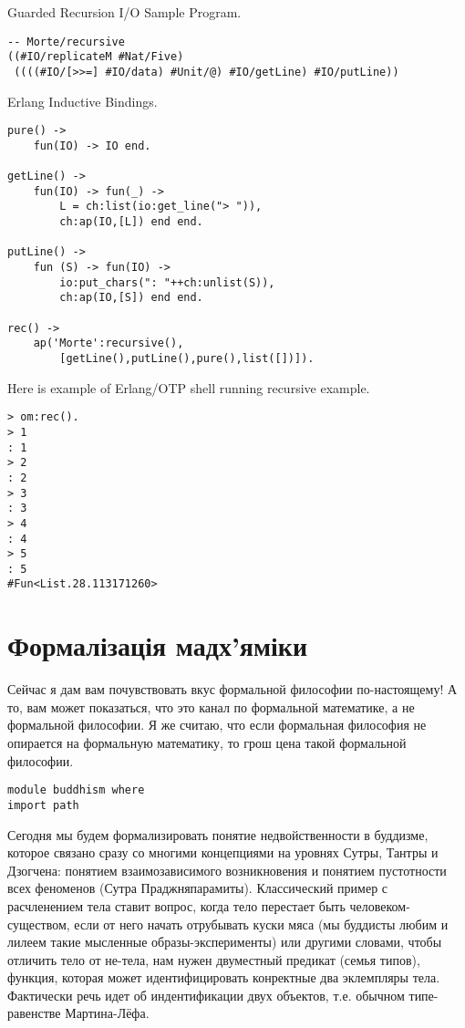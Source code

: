 Guarded Recursion I/O Sample Program.

\begin{lstlisting}[mathescape=true]
-- Morte/recursive
((#IO/replicateM #Nat/Five)
 ((((#IO/[>>=] #IO/data) #Unit/@) #IO/getLine) #IO/putLine))
\end{lstlisting}

\newpage
Erlang Inductive Bindings.

\begin{lstlisting}[mathescape=true]
pure() ->
    fun(IO) -> IO end.

getLine() ->
    fun(IO) -> fun(_) ->
        L = ch:list(io:get_line("> ")),
        ch:ap(IO,[L]) end end.

putLine() ->
    fun (S) -> fun(IO) ->
        io:put_chars(": "++ch:unlist(S)),
        ch:ap(IO,[S]) end end.

rec() ->
    ap('Morte':recursive(),
        [getLine(),putLine(),pure(),list([])]).
\end{lstlisting}


Here is example of Erlang/OTP shell running recursive example.

\begin{lstlisting}[mathescape=true]
> om:rec().
> 1
: 1
> 2
: 2
> 3
: 3
> 4
: 4
> 5
: 5
#Fun<List.28.113171260>
\end{lstlisting}

\newpage
\section{Формалізація мадх'яміки}

Сейчас я дам вам почувствовать вкус формальной философии по-настоящему!
А то, вам может показаться, что это канал по формальной математике,
а не формальной философии. Я же считаю, что если формальная философия
не опирается на формальную математику, то грош цена такой формальной философии. 

\begin{lstlisting}
module buddhism where
import path
\end{lstlisting}

Сегодня мы будем формализировать понятие недвойственности в буддизме,
которое связано сразу со многими концепциями на уровнях Сутры,
Тантры и Дзогчена: понятием взаимозависимого возникновения и
понятием пустотности всех феноменов (Сутра Праджняпарамиты).
Классический пример с расчленением тела ставит вопрос, когда
тело перестает быть человеком-существом, если от него начать
отрубывать куски мяса (мы буддисты любим и лилеем такие мысленные
образы-эксперименты) или другими словами, чтобы отличить тело от
не-тела, нам нужен двуместный предикат (семья типов), функция,
которая может идентифицировать конректные два эклемпляры тела.
Фактически речь идет об индентификации двух объектов, т.е. обычном
типе-равенстве Мартина-Лёфа.

